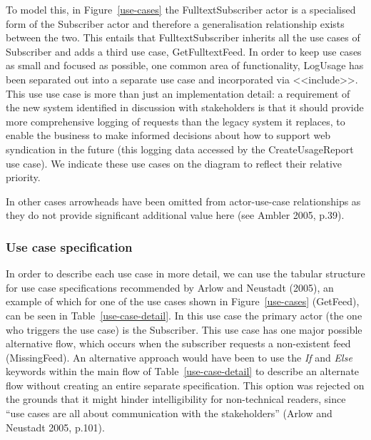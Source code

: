 \documentclass[a4paper]{article}
\begin{document}
To model this, in Figure~\ref{use-cases} the \textsf{FulltextSubscriber} actor is a specialised form of the \textsf{Subscriber} actor and therefore a generalisation relationship exists between the two. This entails that \textsf{FulltextSubscriber} inherits all the use cases of \textsf{Subscriber} and adds a third use case, \textsf{GetFulltextFeed}. In order to keep use cases as small and focused as possible, one common area of functionality, \textsf{LogUsage} has been separated out into a separate use case and incorporated via \textsf{<<include>>}. This use use case is more than just an implementation detail: a requirement of the new system identified in discussion with stakeholders is that it should provide more comprehensive logging of requests than the legacy system it replaces, to enable the business to make informed decisions about how to support web syndication in the future (this logging data accessed by the \textsf{CreateUsageReport} use case). We indicate these use cases on the diagram to reflect their relative priority.

In other cases arrowheads have been omitted from actor-use-case relationships as they do not provide significant additional value here (see Ambler 2005, p.39).

\subsubsection{Use case specification}

In order to describe each use case in more detail, we can use the tabular structure for use case specifications recommended by Arlow and Neustadt (2005), an example of which for one of the use cases shown in Figure~\ref{use-cases} (\textsf{GetFeed}), can be seen in Table~\ref{use-case-detail}. In this use case the primary actor (the one who triggers the use case) is the \textsf{Subscriber}. This use case has one major possible alternative flow, which occurs when the subscriber requests a non-existent feed (\textsf{MissingFeed}). An alternative approach would have been to use the \textit{If} and \textit{Else} keywords within the main flow of Table~\ref{use-case-detail} to describe an alternate flow without creating an entire separate specification. This option was rejected on the grounds that it might hinder intelligibility for non-technical readers, since ``use cases are all about communication with the stakeholders'' (Arlow and Neustadt 2005, p.101).
\end{document}

